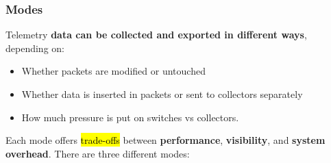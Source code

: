 \subsubsection{Modes}

Telemetry \textbf{data can be collected and exported in different ways}, depending on:
\begin{itemize}
    \item Whether packets are modified or untouched
    \item Whether data is inserted in packets or sent to collectors separately
    \item How much pressure is put on switches vs collectors.
\end{itemize}
Each mode offers \hl{trade-offs} between \textbf{performance}, \textbf{visibility}, and \textbf{system overhead}. There are three different modes:
